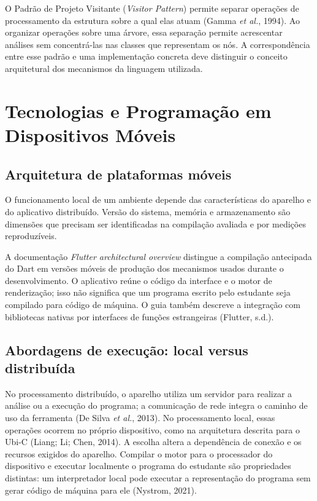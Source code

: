 \documentclass[
    12pt
    ,oneside
    ,a4paper
    ,chapter=TITLE
    ,section=TITLE
    ,sumario=abnt-6027-2012]{abntex2}
\newcommand{\citeDimp}{(De Silva \textit{et al.}, 2013)}
\newcommand{\citeLiang}{(Liang; Li; Chen, 2014)}
\newcommand{\citeNystrom}{(Nystrom, 2021)}
\newcommand{\citeGamma}{(Gamma \textit{et al.}, 1994)}
\begin{document}
O Padrão de Projeto Visitante (\textit{Visitor Pattern}) permite separar operações
de processamento da estrutura sobre a qual elas atuam \citeGamma. Ao organizar
operações sobre uma árvore, essa separação permite acrescentar análises sem
concentrá-las nas classes que representam os nós. A correspondência entre esse
padrão e uma implementação concreta deve distinguir o conceito arquitetural dos
mecanismos da linguagem utilizada.

\section{Tecnologias e Programação em Dispositivos Móveis}

\subsection{Arquitetura de plataformas móveis}

O funcionamento local de um ambiente depende das características do aparelho
e do aplicativo distribuído. Versão do sistema, memória e armazenamento são
dimensões que precisam ser identificadas na compilação avaliada e por medições
reproduzíveis. 

A documentação \textit{Flutter architectural overview} distingue a compilação
antecipada do Dart em versões móveis de produção dos mecanismos usados durante o
desenvolvimento. O aplicativo reúne o código da interface e o motor de renderização;
isso não significa que um programa escrito pelo estudante seja compilado para
código de máquina. O guia também descreve a integração com bibliotecas nativas
por interfaces de funções estrangeiras (Flutter, s.d.).

\subsection{Abordagens de execução: local versus distribuída}

No processamento distribuído, o aparelho utiliza um servidor para realizar a
análise ou a execução do programa; a comunicação de rede integra o caminho de uso
da ferramenta \citeDimp. No processamento local, essas operações ocorrem no
próprio dispositivo, como na arquitetura descrita para o Ubi-C \citeLiang.
A escolha altera a dependência de conexão e os recursos exigidos do aparelho.
Compilar o motor para o processador do dispositivo e executar localmente o programa
do estudante são propriedades distintas: um interpretador local pode executar a
representação do programa sem gerar código de máquina para ele \citeNystrom.
\end{document}
